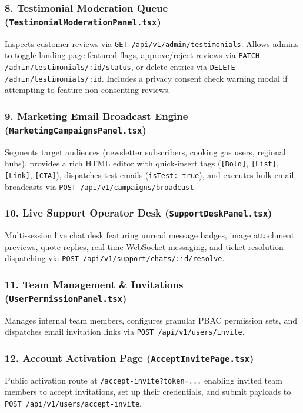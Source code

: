 \documentclass[11pt,a4paper]{article}
\begin{document}
\subsubsection{8. Testimonial Moderation Queue (\texttt{TestimonialModerationPanel.tsx})}
Inspects customer reviews via \texttt{GET /api/v1/admin/testimonials}. Allows admins to toggle landing page featured flags, approve/reject reviews via \texttt{PATCH /admin/testimonials/:id/status}, or delete entries via \texttt{DELETE /admin/testimonials/:id}. Includes a privacy consent check warning modal if attempting to feature non-consenting reviews.

\subsubsection{9. Marketing Email Broadcast Engine (\texttt{MarketingCampaignsPanel.tsx})}
Segments target audiences (newsletter subscribers, cooking gas users, regional hubs), provides a rich HTML editor with quick-insert tags (\texttt{[Bold]}, \texttt{[List]}, \texttt{[Link]}, \texttt{[CTA]}), dispatches test emails (\texttt{isTest: true}), and executes bulk email broadcasts via \texttt{POST /api/v1/campaigns/broadcast}.

\subsubsection{10. Live Support Operator Desk (\texttt{SupportDeskPanel.tsx})}
Multi-session live chat desk featuring unread message badges, image attachment previews, quote replies, real-time WebSocket messaging, and ticket resolution dispatching via \texttt{POST /api/v1/support/chats/:id/resolve}.

\subsubsection{11. Team Management \& Invitations (\texttt{UserPermissionPanel.tsx})}
Manages internal team members, configures granular PBAC permission sets, and dispatches email invitation links via \texttt{POST /api/v1/users/invite}.

\subsubsection{12. Account Activation Page (\texttt{AcceptInvitePage.tsx})}
Public activation route at \texttt{/accept-invite?token=...} enabling invited team members to accept invitations, set up their credentials, and submit payloads to \texttt{POST /api/v1/users/accept-invite}.
\end{document}
